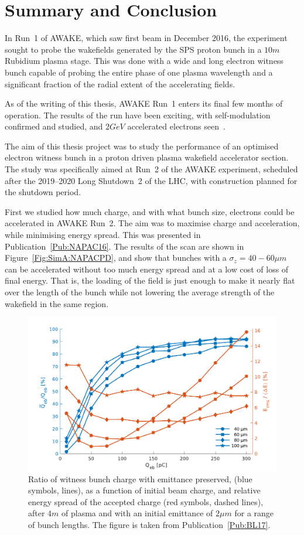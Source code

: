 %
%

\chapter{Summary and Conclusion}
\label{Ch:SnC}

In Run~1 of AWAKE, which saw first beam in December 2016, the experiment sought to probe the wakefields generated by the SPS proton bunch in a $10\unit{m}$ Rubidium plasma stage.
This was done with a wide and long electron witness bunch capable of probing the entire phase of one plasma wavelength and a significant fraction of the radial extent of the accelerating fields.

As of the writing of this thesis, AWAKE Run~1 enters its final few months of operation.
The results of the run have been exciting, with self-modulation confirmed and studied, and $2\unit{GeV}$ accelerated electrons seen~\cite{adli:2018}.

The aim of this thesis project was to study the performance of an optimised electron witness bunch in a proton driven plasma wakefield accelerator section.
The study was specifically aimed at Run~2 of the AWAKE experiment, scheduled after the 2019--2020 Long Shutdown~2 of the LHC, with construction planned for the shutdown period.

First we studied how much charge, and with what bunch size, electrons could be accelerated in AWAKE Run~2.
The aim was to maximise charge and acceleration, while minimising energy spread.
This was presented in Publication~\ref{Pub:NAPAC16}.
The results of the scan are shown in Figure~\ref{Fig:SimA:NAPACPD}, and show that bunches with a $\sigma_z = 40-60\unit{\mu m}$ can be accelerated without too much energy spread and at a low cost of loss of final energy.
That is, the loading of the field is just enough to make it nearly flat over the length of the bunch while not lowering the average strength of the wakefield in the same region.

\begin{figure}[hbt]
    \centering
    \includegraphics[width=0.8125\linewidth]{figures/BeamQuality}
    \caption{\label{Fig:Sum:BQ}
        Ratio of witness bunch charge with emittance preserved, (blue symbols, lines), as a function of initial beam charge, and relative energy spread of the accepted charge (red symbols, dashed lines), after $4\unit{m}$ of plasma and with an initial emittance of $2\unit{\mu m}$ for a range of bunch lengths.
        The figure is taken from Publication~\ref{Pub:BL17}.
    }
\end{figure}

